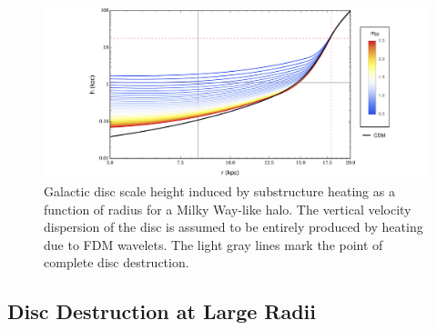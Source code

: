 \documentclass[usenatbib]{mnras}
\begin{document}
\begin{figure}
\includegraphics[width=18cm]{disk_scale_height}
\vspace*{-5mm}
\caption{Galactic disc scale height induced by substructure heating as a function of radius for a Milky Way-like halo. The vertical velocity dispersion of the disc is assumed to be entirely produced by heating due to FDM wavelets. The light gray lines mark the point of complete disc destruction. }
\label{fig:disc_scale_height}
\end{figure}

\subsection{Disc Destruction at Large Radii}
\end{document}
